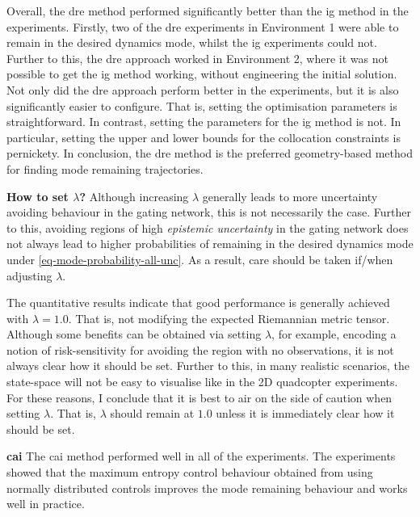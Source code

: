 \documentclass{mimosis-class/mimosis}
\numberwithin{equation}{chapter}
\begin{document}
{Overall, the \acrshort{dre} method performed significantly better than the \acrshort{ig} method in the experiments.
Firstly, two of the \acrshort{dre} experiments in Environment 1 were able to remain in the desired dynamics mode,
whilst the \acrshort{ig} experiments could not.
Further to this, the \acrshort{dre} approach worked in Environment 2, where it was not possible to get the
\acrshort{ig} method working, without engineering the initial solution.
Not only did the \acrshort{dre} approach perform better in the experiments, but it is also significantly easier
to configure.
That is, setting the optimisation parameters is straightforward.
In contrast, setting the parameters for the \acrshort{ig} method is not.
In particular, setting the upper and lower bounds for the collocation constraints is pernickety.
In conclusion, the \acrshort{dre} method is the preferred geometry-based method for finding mode remaining
trajectories.

\textbf{How to set \(\lambda\)?}
Although increasing \(\lambda\) generally leads to more uncertainty avoiding behaviour in the gating network,
this is not necessarily the case.
Further to this,
avoiding regions of high \emph{epistemic uncertainty} in the gating network does not always lead to higher probabilities
of remaining in the desired dynamics mode under \cref{eq-mode-probability-all-unc}.
As a result, care should be taken if/when adjusting \(\lambda\).

The quantitative results indicate that good performance is generally achieved with \(\lambda=1.0\).
That is, not modifying the expected Riemannian metric tensor.
Although some benefits can be obtained via setting \(\lambda\),
for example, encoding a notion of risk-sensitivity for avoiding the region with no observations,
it is not always clear how it should be set.
Further to this, in many realistic scenarios, the state-space will not be easy to visualise like in
the 2D quadcopter experiments.
For these reasons, I conclude that it is best to air on the side of caution when setting \(\lambda\).
That is, \(\lambda\) should remain at \(1.0\) unless it is immediately clear how it should be set.


\textbf{\acrfull{cai}}
The \acrshort{cai} method performed well in all of the experiments.
The experiments showed that the maximum entropy control behaviour obtained from using normally distributed controls
improves the mode remaining behaviour and works well in practice.


}
\end{document}
